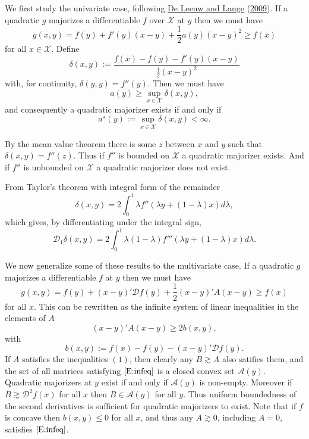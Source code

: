 \documentclass[
  12pt,
]{book}
\begin{document}
We first study the univariate case, following \protect\hyperlink{ref-deleeuw_lange_A_09}{De Leeuw and Lange} (\protect\hyperlink{ref-deleeuw_lange_A_09}{2009}). If a quadratic \(g\) majorizes a differentiable \(f\) over \(\mathcal{X}\) at \(y\) then we must have
\[
g(x,y)=f(y)+f'(y)(x-y)+\frac12 a(y)(x-y)^2\geq f(x)
\]
for all \(x\in\mathcal{X}.\) Define
\[
\delta(x,y):=\frac{f(x)-f(y)-f'(y)(x-y)}{\frac12(x-y)^2}
\]
with, for continuity, \(\delta(y,y)=f''(y).\) Then we must have
\[
a(y)\geq\sup_{x\in\mathcal{X}}\delta(x,y),
\]
and consequently a quadratic majorizer exists if and only if
\[
a^\star(y):=\sup_{x\in\mathcal{X}}\delta(x,y)<\infty.
\]

By the mean value theorem there is some \(z\) between \(x\) and \(y\) such that \(\delta(x,y)=f''(z).\) Thus if \(f''\) is bounded on \(\mathcal{X}\) a quadratic majorizer exists. And if \(f''\) is unbounded
on \(\mathcal{X}\) a quadratic majorizer does not exist.

From Taylor's theorem with integral form of the remainder
\[
\delta(x,y)=2\int_0^1\lambda f''(\lambda y+(1-\lambda)x) d\lambda,
\]
which gives, by differentiating under the integral sign,
\[
\mathcal{D}_1\delta(x,y)=2\int_0^1\lambda(1-\lambda)f'''(\lambda y+(1-\lambda)x)d\lambda.
\]

We now generalize some of these results to the multivariate case.
If a quadratic \(g\) majorizes a differentiable \(f\) at \(y\) then we must have
\[
g(x,y)=f(y)+(x-y)'\mathcal{D}f(y)+\frac12(x-y)'A(x-y)\geq f(x)
\]
for all \(x.\) This can be rewritten as the infinite system of linear inequalities
in the elements of \(A\)
\begin{equation}
(x-y)'A(x-y)\geq 2b(x,y),\label{E:infeq}
\end{equation}
with
\[
b(x,y):=f(x)-f(y)-(x-y)'\mathcal{D}f(y).
\]
If \(A\) satisfies the inequalities \((1)\), then clearly any \(B\gtrsim A\) also satifies them, and the set of all matrices satisfying \(\eqref{E:infeq}\) is a closed convex set \(\mathcal{A}(y)\). Quadratic majorizers at \(y\) exist if and only if \(\mathcal{A}(y)\) is non-empty. Moreover if \(B\gtrsim\mathcal{D}^2f(x)\) for all \(x\) then \(B\in\mathcal{A}(y)\) for all \(y.\) Thus uniform boundedness of the second derivatives is sufficient for quadratic majorizers to exist. Note that if \(f\) is concave then \(b(x,y)\leq 0\) for all \(x\), and thus any \(A\gtrsim 0\), including \(A=0\), satisfies \(\eqref{E:infeq}\).
\end{document}
